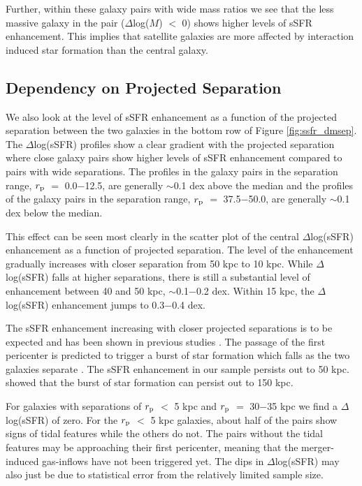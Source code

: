 \documentclass[iop,revtex4,twocolumn,apj,numberedappendix,appendixfloats]{emulateapj}
\begin{document}
Further, within these galaxy pairs with wide mass ratios we see that the less massive galaxy in the pair ($\Delta$log($M$) $<$ 0) shows higher levels of sSFR enhancement. This implies that satellite galaxies are more affected by interaction induced star formation than the central galaxy. 

\subsection{Dependency on Projected Separation}\label{sec:sep}

We also look at the level of sSFR enhancement as a function of the projected separation between the two galaxies in the bottom row of Figure \ref{fig:ssfr_dmsep}. The $\Delta$log(sSFR) profiles show a clear gradient with the projected separation where close galaxy pairs show higher levels of sSFR enhancement compared to pairs with wide separations. The profiles in the galaxy pairs in the separation range, $r_{\rm p}$ $=$ 0.0$-$12.5, are generally $\sim$0.1 dex above the median and the profiles of the galaxy pairs in the separation range, $r_{\rm p}$ $=$ 37.5$-$50.0, are generally $\sim$0.1 dex below the median. 

This effect can be seen most clearly in the scatter plot of the central $\Delta$log(sSFR) enhancement as a function of projected separation. The level of the enhancement gradually increases with closer separation from 50 kpc to 10 kpc. While $\Delta$log(sSFR) falls at higher separations, there is still a substantial level of enhancement between 40 and 50 kpc, $\sim$0.1$-$0.2 dex. Within 15 kpc, the $\Delta$log(sSFR) enhancement jumps to 0.3$-$0.4 dex. 

The sSFR enhancement increasing with closer projected separations is to be expected and has been shown in previous studies \citep{Li:2008, Ellison:2008, Scudder:2012, Patton:2013}. The passage of the first pericenter is predicted to trigger a burst of star formation which falls as the two galaxies separate \citep{Scudder:2012}. The sSFR enhancement in our sample persists out to 50 kpc. \citet{Patton:2013} showed that the burst of star formation can persist out to 150 kpc. 

For galaxies with separations of $r_{\rm p}$ $<$ 5 kpc and $r_{\rm p}$ $=$ 30$-$35 kpc we find a $\Delta$log(sSFR) of zero. For the $r_{\rm p}$ $<$ 5 kpc galaxies, about half of the pairs show signs of tidal features while the others do not. The pairs without the tidal features may be approaching their first pericenter, meaning that the merger-induced gas-inflows have not been triggered yet. The dips in $\Delta$log(sSFR) may also just be due to statistical error from the relatively limited sample size.  
\end{document}
